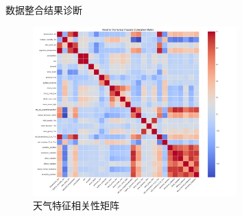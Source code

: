 \documentclass{beamer} %
\begin{document}
\begin{frame}{数据整合结果诊断}
    \begin{figure}[H]
        \centering
        \includegraphics[width=0.7\textwidth]{../plots/weather_correlation_matrix.png}
        \caption{天气特征相关性矩阵}
    \end{figure}
\end{frame}


\end{document}
